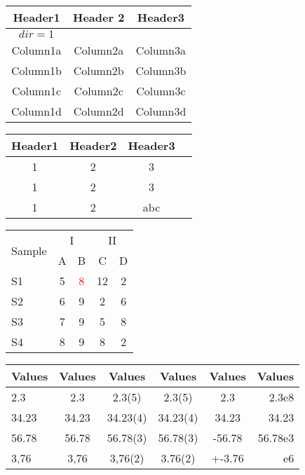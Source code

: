 \documentclass[12pt]{ctexart}
\begin{document}
\noindent
\begin{tabular}{*{3}{c}}
    \hline
    Header1 & Header 2 & Header3 \\
    \hline
    $dir=1$\\
    Column1a & Column2a & Column3a \\
    Column1b & Column2b & Column3b \\
    Column1c & Column2c & Column3c \\
    Column1d & Column2d & Column3d \\
    \hline
\end{tabular}
\quad
\begin{tabular}{@{}
    c*{3} {S[table-format = 2.2,color=orange]}
    @{}}
    \toprule
    {Header1} & {Header2} & {Header3} \\
     & 2 & 3\\
    1 & 2 & 3\\
    1 & 2 & abc\\
    \bottomrule
\end{tabular}
\noindent 
\begin{table}[h]\centering
    \begin{tabular}{@{}lcccc@{}}
    \toprule
    \multirow[c]{2}[3]{*}{Sample} & \multicolumn{2}{c}{I} & \multicolumn{2}{c}{II} \\
    \cmidrule(lr){2-3} \cmidrule(lr){4-5}
     & A & B & C & D \\
    \midrule
    S1 & \cellcolor{orange}5 & \textcolor{red}8 & 12 & 2 \\
    S2 & 6 & 9 & 2 & 6 \\
    \rowcolor{orange}
    S3 & 7 & 9 & 5 & 8 \\
    S4 & 8 & 9 & 8 & 2 \\
    \bottomrule
    \end{tabular}
\end{table}

\begin{tabular}{@{}lccccr@{}}
\toprule
{Values}
& {Values}
& {Values}
& {Values}
& {Values}
& {Values} \\
\midrule
2.3 & 2.3 & 2.3(5) & 2.3(5) & 2.3 & 2.3e8 \\
34.23 & 34.23 & 34.23(4) & 34.23(4) & 34.23 & 34.23 \\
56.78 & 56.78 & 56.78(3) & 56.78(3) & -56.78 & 56.78e3 \\
3,76 & 3,76 & 3,76(2) & 3.76(2) & +-3.76 & e6 \\
\bottomrule
\end{tabular}
\end{document}
